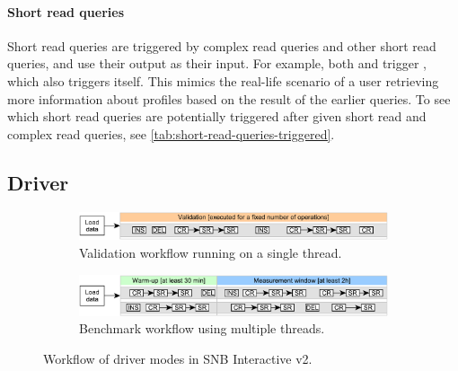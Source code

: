 \paragraph{Short read queries}
%
Short read queries are triggered by complex read queries and other short read queries, and use their output as their input.
For example, both \CR[3] and \CR[14] trigger \SR[2], which also triggers itself.
This mimics the real-life scenario of a user retrieving more information about \Person profiles based on the result of the earlier queries.
To see which short read queries are potentially triggered after given short read and complex read queries, see \autoref{tab:short-read-queries-triggered}.

\subsection{Driver}
\label{sec:driver}

\begin{figure}[htb]
    \centering
    \begin{subfigure}{\linewidth}
        \centering
        \includegraphics[scale=\yedscale]{figures/interactive-v2-validation-workflow}
        \caption{Validation workflow running on a single thread.}
        \label{fig:interactive-validation-workflow}
    \end{subfigure}
    \begin{subfigure}{\linewidth}
        \centering
        \includegraphics[scale=\yedscale]{figures/interactive-v2-benchmark-workflow}
        \caption{Benchmark workflow using multiple threads.}
        \label{fig:interactive-benchmark-workflow}
    \end{subfigure}
    \caption{
        Workflow of driver modes in SNB Interactive v2.
    }
    \label{fig:interactive-workflows}
    \vspace{-2.5ex}
\end{figure}

